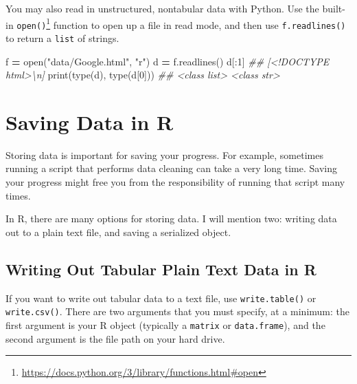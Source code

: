 \documentclass[
  12pt,
  krantz2]{krantz}
\makeatletter
\newenvironment{Shaded}{\begin{snugshade}}{\end{snugshade}}
\newcommand{\BuiltInTok}[1]{#1}
\newcommand{\CommentTok}[1]{\textcolor[rgb]{0.37,0.37,0.37}{\textit{#1}}}
\newcommand{\DecValTok}[1]{\textcolor[rgb]{0.06,0.06,0.06}{#1}}
\newcommand{\NormalTok}[1]{#1}
\newcommand{\OperatorTok}[1]{\textcolor[rgb]{0.43,0.43,0.43}{\textbf{#1}}}
\newcommand{\StringTok}[1]{\textcolor[rgb]{0.5,0.5,0.5}{#1}}
\renewcommand{\href}[2]{#2\footnote{\url{#1}}}
\newenvironment{kframe}{%
\medskip{}
\setlength{\fboxsep}{.8em}
 \def\at@end@of@kframe{}%
 \ifinner\ifhmode%
  \def\at@end@of@kframe{\end{minipage}}%
  \begin{minipage}{\columnwidth}%
 \fi\fi%
 \def\FrameCommand##1{\hskip\@totalleftmargin \hskip-\fboxsep
 \colorbox{shadecolor}{##1}\hskip-\fboxsep
     \hskip-\linewidth \hskip-\@totalleftmargin \hskip\columnwidth}%
 \MakeFramed {\advance\hsize-\width
   \@totalleftmargin\z@ \linewidth\hsize
   \@setminipage}}%
 {\par\unskip\endMakeFramed%
 \at@end@of@kframe}
\renewenvironment{Shaded}{\begin{kframe}}{\end{kframe}}
\makeatother
\begin{document}
You may also read in unstructured, nontabular data with Python. Use the built-in \href{https://docs.python.org/3/library/functions.html\#open}{\texttt{open()}} function to open up a file in read mode, and then use \texttt{f.readlines()} to return a \texttt{list} of strings.

\begin{Shaded}
\begin{Highlighting}[]
\NormalTok{f }\OperatorTok{=} \BuiltInTok{open}\NormalTok{(}\StringTok{"data/Google.html"}\NormalTok{, }\StringTok{"r"}\NormalTok{)}
\NormalTok{d }\OperatorTok{=}\NormalTok{ f.readlines()}
\NormalTok{d[:}\DecValTok{1}\NormalTok{]}
\CommentTok{\#\# [\textquotesingle{}\textless{}!DOCTYPE html\textgreater{}\textbackslash{}n\textquotesingle{}]}
\BuiltInTok{print}\NormalTok{(}\BuiltInTok{type}\NormalTok{(d), }\BuiltInTok{type}\NormalTok{(d[}\DecValTok{0}\NormalTok{]))}
\CommentTok{\#\# \textless{}class \textquotesingle{}list\textquotesingle{}\textgreater{} \textless{}class \textquotesingle{}str\textquotesingle{}\textgreater{}}
\end{Highlighting}
\end{Shaded}

\hypertarget{saving-data-in-r}{%
\section{Saving Data in R}\label{saving-data-in-r}}

Storing data is important for saving your progress. For example, sometimes running a script that performs data cleaning can take a very long time. Saving your progress might free you from the responsibility of running that script many times.

In R, there are many options for storing data. I will mention two: writing data out to a plain text file, and saving a serialized object.

\hypertarget{writing-out-tabular-plain-text-data-in-r}{%
\subsection{Writing Out Tabular Plain Text Data in R}\label{writing-out-tabular-plain-text-data-in-r}}

If you want to write out tabular data to a text file, use \texttt{write.table()} or \texttt{write.csv()}. There are two arguments that you must specify, at a minimum: the first argument is your R object (typically a \texttt{matrix} or \texttt{data.frame}), and the second argument is the file path on your hard drive.
\end{document}
